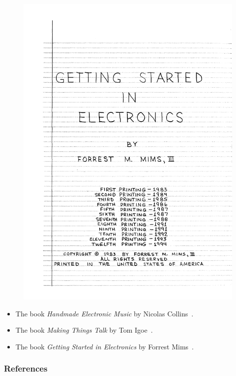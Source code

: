 \documentclass[screen, aspectratio=43]{beamer}
\begin{document}
\begin{frame}
\begin{figure}
\includegraphics[scale=0.12]{img/gettingstartedelectronics-book.pdf}
\end{figure}
\begin{itemize}
\item The book \emph{Handmade Electronic Music} by Nicolas Collins~\cite{Collins.2006.handmadebook}.
\item The book \emph{Making Things Talk} by Tom Igoe~\cite{Igoe.2007.making}.
\item The book \emph{Getting Started in Electronics} by Forrest Mims~\cite{Mims.1983.radioshack}.
\end{itemize}
\end{frame}
%
\begin{frame}
  \frametitle{References}
  \printbibliography
\end{frame}
%
\end{document}

